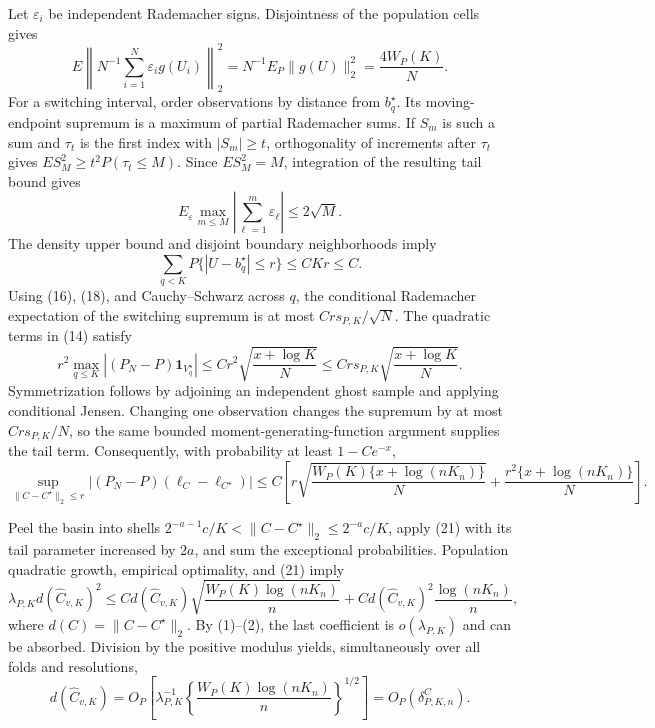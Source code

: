 Let \(\varepsilon_i\) be independent Rademacher signs.  Disjointness of the population cells gives
\[
 E\left\|N^{-1}\sum_{i=1}^N\varepsilon_i g(U_i)\right\|_2^2
 =N^{-1}E_P\|g(U)\|_2^2=\frac{4W_P(K)}N.                                   \tag{17}
\]
For a switching interval, order observations by distance from \(b_q^\star\).  Its moving-endpoint supremum is a maximum of partial Rademacher sums.  If \(S_m\) is such a sum and \(\tau_t\) is the first index with \(|S_m|\geq t\), orthogonality of increments after \(\tau_t\) gives \(ES_M^2\geq t^2P(\tau_t\leq M)\).  Since \(ES_M^2=M\), integration of the resulting tail bound gives
\[
 E_\varepsilon\max_{m\leq M}\left|\sum_{\ell=1}^m\varepsilon_\ell\right|
 \leq2\sqrt M.                                                               \tag{18}
\]
The density upper bound and disjoint boundary neighborhoods imply
\[
 \sum_{q<K}P\{|U-b_q^\star|\leq r\}\leq CKr\leq C.                        \tag{19}
\]
Using (16), (18), and Cauchy--Schwarz across \(q\), the conditional Rademacher expectation of the switching supremum is at most \(Crs_{P,K}/\sqrt N\).  The quadratic terms in (14) satisfy
\[
 r^2\max_{q\leq K}|(P_N-P)\mathbf1_{V_q^\star}|
 \leq Cr^2\sqrt{\frac{x+\log K}{N}}
 \leq Crs_{P,K}\sqrt{\frac{x+\log K}{N}}.                                 \tag{20}
\]
Symmetrization follows by adjoining an independent ghost sample and applying conditional Jensen.  Changing one observation changes the supremum by at most \(Crs_{P,K}/N\), so the same bounded moment-generating-function argument supplies the tail term.  Consequently, with probability at least \(1-Ce^{-x}\),
\[
 \sup_{\|C-C^\star\|_2\leq r}
 |(P_N-P)(\ell_C-\ell_{C^\star})|
 \leq C\left[
 r\sqrt{\frac{W_P(K)\{x+\log(nK_n)\}}N}
 +\frac{r^2\{x+\log(nK_n)\}}N\right].                                    \tag{21}
\]

Peel the basin into shells \(2^{-a-1}c/K<\|C-C^\star\|_2\leq2^{-a}c/K\), apply (21) with its tail parameter increased by \(2a\), and sum the exceptional probabilities.  Population quadratic growth, empirical optimality, and (21) imply
\[
 \lambda_{P,K}d(\widehat C_{v,K})^2
 \leq C d(\widehat C_{v,K})
 \sqrt{\frac{W_P(K)\log(nK_n)}n}
 +C d(\widehat C_{v,K})^2\frac{\log(nK_n)}n,                               \tag{22}
\]
where \(d(C)=\|C-C^\star\|_2\).  By (1)--(2), the last coefficient is \(o(\lambda_{P,K})\) and can be absorbed.  Division by the positive modulus yields, simultaneously over all folds and resolutions,
\[
 d(\widehat C_{v,K})
 =O_P\!\left[\lambda_{P,K}^{-1}
 \left\{\frac{W_P(K)\log(nK_n)}n\right\}^{1/2}\right]
 =O_P(\delta^C_{P,K,n}).                                                     \tag{23}
\]

